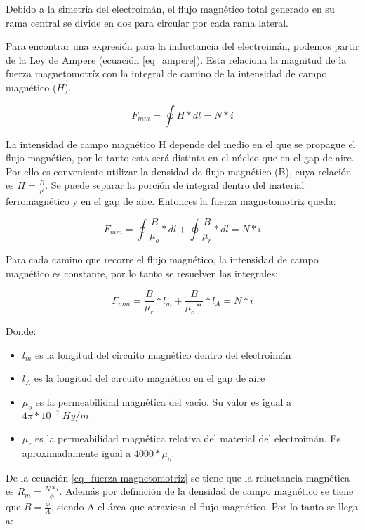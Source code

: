 \noindent Debido a la simetría del electroimán, el flujo magnético total generado en su rama central se divide en dos para circular por cada rama lateral.

\noindent Para encontrar una expresión para la inductancia del electroimán, podemos partir de la Ley de Ampere (ecuación \ref{eq_ampere}). Esta relaciona la magnitud de la fuerza magnetomotríz con la integral de camino de la intensidad de campo magnético ($H$).

\begin{equation} \label{eq_ampere}
	F_{mm}=\oint{H*dl}=N*i
\end{equation}

\noindent La intensidad de campo magnético H depende del medio en el que se propague el flujo magnético, por lo tanto esta será distinta en el núcleo que en el gap de aire. Por ello es conveniente utilizar la densidad de flujo magnético (B), cuya relación es $H=\frac{B}{\mu}$. Se puede separar la porción de integral dentro del material ferromagnético y en el gap de aire. Entonces la fuerza magnetomotriz queda:

\begin{equation} 
	F_{mm}=\oint{\frac{B}{\mu_{o}}*dl}+\oint{\frac{B}{\mu_{r}}*dl}=N*i
\end{equation}

\noindent Para cada camino que recorre el flujo magnético, la intensidad de campo magnético es constante, por lo tanto se resuelven las integrales:

\begin{equation}
	F_{mm}=\frac{B}{\mu_{r}}*l_{m}+\frac{B}{\mu_{o}*}*l_{A}=N*i
\end{equation}

Donde:
\begin{itemize}
	\item $l_{m}$ es la longitud del circuito magnético dentro del electroimán
	\item $l_{A}$ es la longitud del circuito magnético en el gap de aire
	\item $\mu_{o}$ es la permeabilidad magnética del vacio. Su valor es igual a $4 \pi * 10^{-7}\:Hy/m$
	\item $\mu_{r}$ es la permeabilidad magnética relativa del material del electroimán. Es aproximadamente igual a $4000 * \mu_{o}$.

\end{itemize}

\noindent De la ecuación \ref{eq_fuerza-magnetomotriz} se tiene que la reluctancia magnética es $R_{m}=\frac{N*i}{\phi}$. Además por definición de la densidad de campo magnético se tiene que $B=\frac{\phi}{A}$, siendo A el área que atraviesa el flujo magnético. Por lo tanto se llega a:

